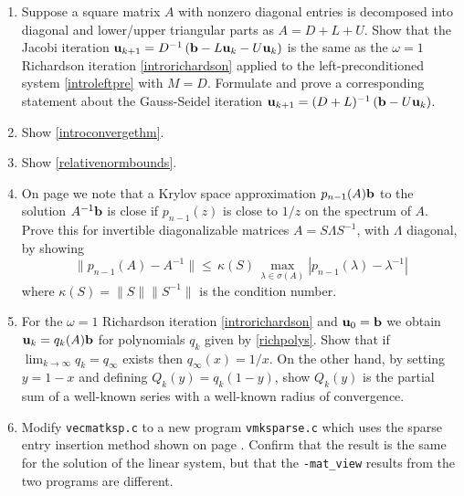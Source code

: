 \renewcommand{\labelenumi}{\arabic{chapter}.\arabic{enumi}\quad}
\begin{enumerate}
\item \label{exer:ls:jacobirichardson}  Suppose a square matrix $A$ with nonzero diagonal entries is decomposed into diagonal and lower/upper triangular parts as $A=D+L+U$.  Show that the Jacobi iteration $\mathbf{u}_{k+1} = D^{-1} \left(\mathbf{b} - L \mathbf{u}_k - U \mathbf{u}_k\right)$ is the same as the $\omega=1$ Richardson iteration \eqref{introrichardson} applied to the left-preconditioned system \eqref{introleftpre} with $M=D$.  Formulate and prove a corresponding statement about the Gauss-Seidel iteration $\mathbf{u}_{k+1} = (D+L)^{-1} \left(\mathbf{b} - U \mathbf{u}_k\right)$.
\item \label{exer:ls:showconvergethm}  Show \eqref{introconvergethm}.

\item \label{exer:ls:errornorms}  Show \eqref{relativenormbounds}.

\item On page \pageref{eq:ls:krylovgoal} we note that a Krylov space approximation $p_{n-1}(A)\mathbf{b}$ to the solution $A^{-1}\mathbf{b}$ is close if $p_{n-1}(z)$ is close to $1/z$ on the spectrum of $A$.  Prove this for invertible diagonalizable matrices $A=S\Lambda S^{-1}$, with $\Lambda$ diagonal, by showing
	$$\|p_{n-1}(A) - A^{-1}\| \le \,\kappa(S)\, \max_{\lambda \in \sigma(A)} |p_{n-1}(\lambda) - \lambda^{-1}|$$
where $\kappa(S) = \|S\| \|S^{-1}\|$ is the condition number.

\item For the $\omega=1$ Richardson iteration \eqref{introrichardson} and $\mathbf{u}_0=\mathbf{b}$ we obtain $\mathbf{u}_k = q_k(A) \mathbf{b}$ for polynomials $q_k$ given by \eqref{richpolys}.  Show that if $\lim_{k\to\infty} q_k=q_\infty$ exists then $q_\infty(x)=1/x$.  On the other hand, by setting $y=1-x$ and defining $Q_k(y)=q_k(1-y)$, show $Q_k(y)$ is the partial sum of a well-known series with a well-known radius of convergence.

\item \label{exer:ls:sparseinsertion}  Modify \texttt{vecmatksp.c} to a new program \texttt{vmksparse.c} which uses the sparse entry insertion method shown on page \pageref{page:ls:sparseinsertion}.  Confirm that the result is the same for the solution of the linear system, but that the \texttt{-mat\_view} results from the two programs are different.


\end{enumerate}
